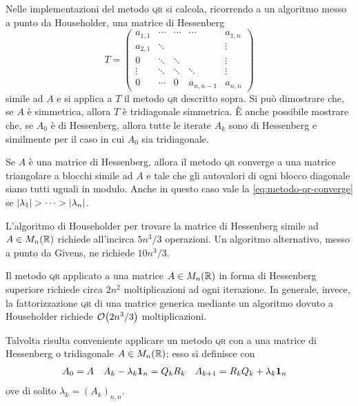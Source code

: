 	Nelle implementazioni del metodo \textsc{qr} si calcola, ricorrendo a un algoritmo messo a punto da Householder, una matrice di Hessenberg
	\begin{equation*}
		T =
		\begin{pmatrix}
			a_{1, 1} & \cdots & \cdots & \cdots       & a_{1, n} \\
			a_{2, 1} & \ddots &        &              & \vdots   \\
			0        & \ddots & \ddots &              & \vdots   \\
			\vdots   & \ddots & \ddots & \ddots       & \vdots   \\
			0        & \cdots & 0      & a_{n, n - 1} & a_{n, n}
		\end{pmatrix}
	\end{equation*}
	simile ad \(A\) e si applica a \(T\) il metodo \textsc{qr} descritto sopra. Si può dimostrare che, se \(A\) è simmetrica, allora \(T\) è tridiagonale simmetrica. È anche possibile mostrare che, se \(A_0\) è di Hessenberg, allora tutte le iterate \(A_k\) sono di Hessenberg e similmente per il caso in cui \(A_0\) sia tridiagonale.
	
	Se \(A\) è una matrice di Hessenberg, allora il metodo \textsc{qr} converge a una matrice triangolare a blocchi simile ad \(A\) e tale che gli autovalori di ogni blocco diagonale siano tutti uguali in modulo. Anche in questo caso vale la \eqref{eq:metodo-qr-converge} se \(\abs{\lambda_1} > \dots > \abs{\lambda_n}\).
	
	\begin{osservazione}
		L'algoritmo di Householder per trovare la matrice di Hessenberg simile ad \(A \in M_n (\mathbb{R})\) richiede all'incirca \(5 n^3 / 3\) operazioni. Un algoritmo alternativo, messo a punto da Givens, ne richiede \(10 n^3 / 3\).
		
		Il metodo \textsc{qr} applicato a una matrice \(A \in M_n (\mathbb{R})\) in forma di Hessenberg superiore richiede circa \(2 n^2\) moltiplicazioni ad ogni iterazione. In generale, invece, la fattorizzazione \textsc{qr} di una matrice generica mediante un algoritmo dovuto a Householder richiede \(\order{2 n^3 / 3}\) moltiplicazioni.
	\end{osservazione}

	\begin{nota}
		Talvolta risulta conveniente applicare un metodo \textsc{qr} con  a una matrice di Hessenberg o tridiagonale \(A \in M_n (\mathbb{R})\); esso si definisce con
		\begin{align*}
			A_0 &= A &
			A_k - \lambda_k \mathbf{1}_n &= Q_k R_k &
			A_{k + 1} &= R_k Q_k + \lambda_k \mathbf{1}_n
		\end{align*}
		ove di solito \(\lambda_k = (A_k)_{n, n}\).
	\end{nota}